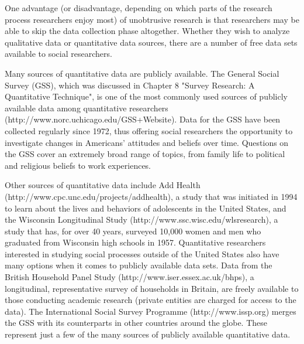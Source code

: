 One advantage (or disadvantage, depending on which parts of the research process researchers enjoy most) of unobtrusive research is that researchers may be able to skip the data collection phase altogether. Whether they wish to analyze qualitative data or quantitative data sources, there are a number of free data sets available to social researchers.

Many sources of quantitative data are publicly available. The General Social Survey (GSS), which was discussed in Chapter 8 "Survey Research: A Quantitative Technique", is one of the most commonly used sources of publicly available data among quantitative researchers (http://www.norc.uchicago.edu/GSS+Website). Data for the GSS have been collected regularly since 1972, thus offering social researchers the opportunity to investigate changes in Americans' attitudes and beliefs over time. Questions on the GSS cover an extremely broad range of topics, from family life to political and religious beliefs to work experiences.

Other sources of quantitative data include Add Health (http://www.cpc.unc.edu/projects/addhealth), a study that was initiated in 1994 to learn about the lives and behaviors of adolescents in the United States, and the Wisconsin Longitudinal Study (http://www.ssc.wisc.edu/wlsresearch), a study that has, for over 40 years, surveyed 10,000 women and men who graduated from Wisconsin high schools in 1957. Quantitative researchers interested in studying social processes outside of the United States also have many options when it comes to publicly available data sets. Data from the British Household Panel Study (http://www.iser.essex.ac.uk/bhps), a longitudinal, representative survey of households in Britain, are freely available to those conducting academic research (private entities are charged for access to the data). The International Social Survey Programme (http://www.issp.org) merges the GSS with its counterparts in other countries around the globe. These represent just a few of the many sources of publicly available quantitative data.

